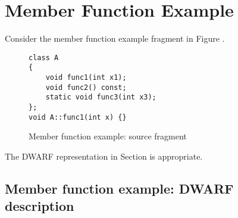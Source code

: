 \section{Member Function Example}
\label{app:memberfunctionexample}

Consider the member function example fragment in 
Figure .

\begin{figure}[here]
\begin{lstlisting}
class A
{
    void func1(int x1);
    void func2() const;
    static void func3(int x3);
};
void A::func1(int x) {}
\end{lstlisting}
\caption{Member function example: source fragment} \label{fig:memberfunctionexamplesourcefragment}
\end{figure}



The DWARF representation in 
Section 
is appropriate.

\subsection{Member function example: DWARF description}
\label{app:memberfunctionexampledwarfdescription}


